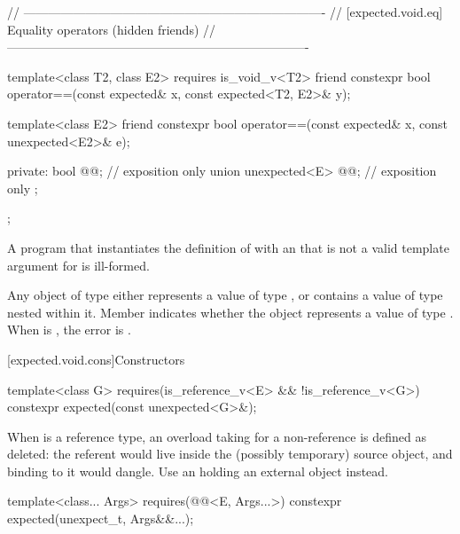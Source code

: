 \begin{codeblock}
{  // -------------------------------------------------------------------------
  // [expected.void.eq] Equality operators (hidden friends)
  // -------------------------------------------------------------------------

  template<class T2, class E2>
    requires is_void_v<T2>
  friend constexpr bool operator==(const expected& x, const expected<T2, E2>& y);

  template<class E2>
  friend constexpr bool operator==(const expected& x, const unexpected<E2>& e);

private:
  bool @@; // exposition only
  union {
    unexpected<E> @@; // exposition only
  };
};
\end{codeblock}

\begin{itemdescr}
\pnum
\mandates
A program that instantiates the definition of  with an  that is not a valid template argument for  is ill-formed.

\pnum
\remarks
Any object of type  either represents a value of type , or contains a value of type  nested within it. Member  indicates whether the  object represents a value of type . When  is , the error is .
\end{itemdescr}

[expected.void.cons]{Constructors}

%
\begin{itemdecl}
template<class G>
  requires(is_reference_v<E> && !is_reference_v<G>)
constexpr expected(const unexpected<G>&);
\end{itemdecl}

\begin{itemdescr}
\pnum
\remarks
When  is a reference type, an overload taking  for a non-reference  is defined as deleted: the referent would live inside the (possibly temporary) source  object, and binding  to it would dangle. Use an  holding an external object instead.
\end{itemdescr}

%
\begin{itemdecl}
template<class... Args>
  requires(@@<E, Args...>)
constexpr expected(unexpect_t, Args&&...);
\end{itemdecl}

